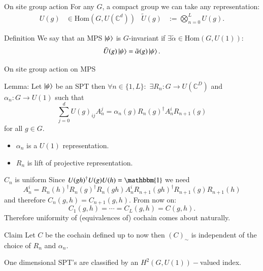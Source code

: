 \documentclass{beamer}
\newcommand{\id}{\mathbbm{1}}
\newcommand{\CC}{\mathbb{C}}
\begin{document}
\begin{frame}{On site group action}
For any $G$, a compact group we can take any representation:
\begin{align}
U(g)&\in\textrm{Hom}(G,U(\CC^d))&\tilde U(g)&:= \bigotimes_{n=0}^L U(g).
\end{align}
\pause
\begin{block}{Definition}
We say that an MPS $\ket{\psi}$ is $G$-invariant if $\exists \tilde{\alpha}\in\textrm{Hom}(G,U(1)):$
\[\tilde{U}(g)\ket{\psi}=\tilde{\alpha}(g)\ket{\psi}.\]
\end{block}
\end{frame}

\begin{frame}{On site group action on MPS}
\begin{block}{Lemma:}
Let $\ket{\psi}$ be an SPT then $\forall n\in\{1,L\}:$ $\exists R_n:G\rightarrow U(\CC^D)$ and $\alpha_n:G\rightarrow U(1)$ such that
\begin{equation}
\sum_{j=0}^{d}U(g)_{ij}A^j_n=\alpha_n(g) R_n(g)^\dagger A^i_n R_{n+1}(g)
\end{equation}
for all $g\in G.$
\end{block}
\pause
\begin{itemize}
\item $\alpha_n$ is a $U(1)$ representation.
\item $R_n$ is lift of projective representation.
\end{itemize}
\end{frame}

\begin{frame}{$C_n$ is uniform}
Since $U(gh)^\dagger U(g)U(h)=\id$ we need
\begin{equation}
A_n^i=R_n(h)^\dagger R_n(g)^\dagger R_{n}(gh) A^i_n R_{n+1}(gh)^\dagger R_{n+1}(g) R_{n+1}(h)
\end{equation}
and therefore $C_n(g,h)=C_{n+1}(g,h)$. From now on:
\[C_1(g,h)=\cdots=C_L(g,h)=C(g,h).\]
\pause
Therefore uniformity of (equivalences of) cochain comes about naturally.
\pause
\begin{block}{Claim}
Let $C$ be the cochain defined up to now then $(C)_\sim$ is independent of the choice of $R_n$ and $\alpha_n$.
\end{block}
\pause
One dimensional SPT's are classified by an $H^2(G,U(1))-$valued index.
\end{frame}
\end{document}
